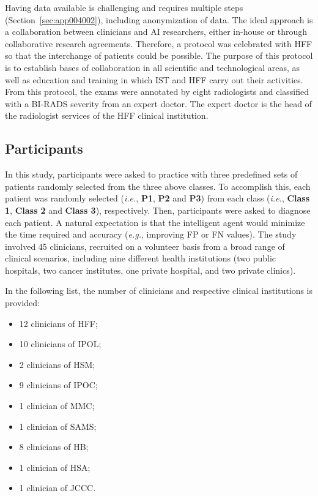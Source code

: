 Having data available is challenging and requires multiple steps (Section~\ref{sec:app004002}), including anonymization of data.
The ideal approach is a collaboration between clinicians and \ac{AI} researchers, either in-house or through collaborative research agreements.
Therefore, a protocol was celebrated with \acs{HFF} so that the interchange of patients could be possible.
The purpose of this protocol is to establish bases of collaboration in all scientific and technological areas, as well as education and training in which \ac{IST} and \acs{HFF} carry out their activities.
From this protocol, the exams were annotated by eight radiologists and classified with a \ac{BI-RADS} severity from an expert doctor.
The expert doctor is the head of the radiologist services of the \acs{HFF} clinical institution.

\subsection{Participants}
\label{sec:chap005005001}

In this study, participants were asked to practice with three predefined sets of patients randomly selected from the three above classes.
To accomplish this, each patient was randomly selected ({\it i.e.}, {\bf P1}, {\bf P2} and {\bf P3}) from each class ({\it i.e.}, {\bf Class 1}, {\bf Class 2} and {\bf Class 3}), respectively.
Then, participants were asked to diagnose each patient.
A natural expectation is that the intelligent agent would minimize the time required and accuracy ({\it e.g.}, improving \ac{FP} or \ac{FN} values).
The study involved 45 clinicians, recruited on a volunteer basis from a broad range of clinical scenarios, including nine different health institutions (two public hospitals, two cancer institutes, one private hospital, and two private clinics).

\vspace{4.00mm}

\noindent
In the following list, the number of clinicians and respective clinical institutions is provided:

\vspace{2.00mm}

\begin{multicols}{2}
\begin{itemize}
\item 12 clinicians of \acs{HFF};  %
\item 10 clinicians of \acs{IPOL}; %
\item 2 clinicians of \acs{HSM};   %
\item 9 clinicians of \acs{IPOC};  %
\item 1 clinician of \acs{MMC};    %
\item 1 clinician of \acs{SAMS};   %
\item 8 clinicians of \acs{HB};    %
\item 1 clinician of \acs{HSA};    %
\item 1 clinician of \acs{JCCC}.   %
\end{itemize}
\end{multicols}

